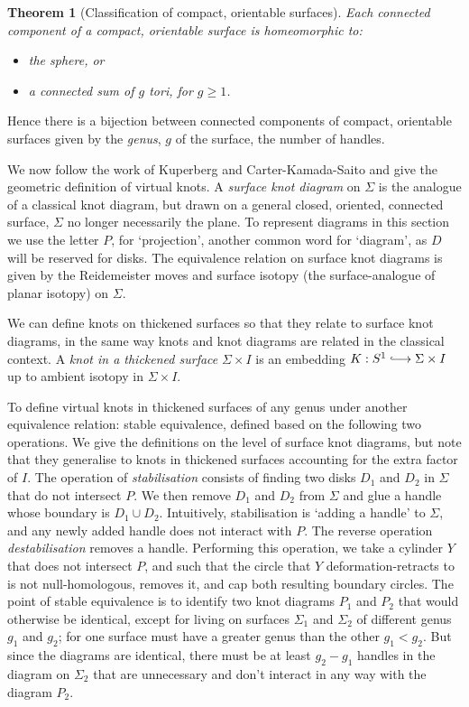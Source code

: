 \documentclass[12pt]{report}
\newtheorem*{theorem}{Theorem}
\begin{document}
\begin{theorem}[Classification of compact, orientable surfaces]
Each connected component of a compact, orientable surface is homeomorphic to:
\begin{itemize}
	\item the sphere, or
	\item a connected sum of $g$ tori, for $g \geq 1$.
\end{itemize}
\end{theorem}
Hence there is a bijection between connected components of compact, orientable surfaces given by the \textit{genus}, $g$ of the surface, the number of handles.

We now follow the work of Kuperberg \cite{what-is-a-virtual-link} and Carter-Kamada-Saito \cite{stable-equivalence-virtual-cobordisms} and give the geometric definition of virtual knots. A \textit{surface knot diagram} on $\Sigma$ is the analogue of a classical knot diagram, but drawn on a general closed, oriented, connected surface, $\Sigma$ no longer necessarily the plane. To represent diagrams in this section we use the letter $P$, for `projection', another common word for `diagram', as $D$ will be reserved for disks. The equivalence relation on surface knot diagrams is given by the Reidemeister moves and surface isotopy (the surface-analogue of planar isotopy) on $\Sigma$.

We can define knots on thickened surfaces so that they relate to surface knot diagrams, in the same way knots and knot diagrams are related in the classical context. A \textit{knot in a thickened surface} $\Sigma \times I$ is an embedding $K:S^{1} \lhook\joinrel\longrightarrow \Sigma \times I$ up to ambient isotopy in $\Sigma \times I$.

To define virtual knots in thickened surfaces of any genus under another equivalence relation: stable equivalence, defined based on the following two operations. We give the definitions on the level of surface knot diagrams, but note that they generalise to knots in thickened surfaces accounting for the extra factor of $I$. The operation of \textit{stabilisation} consists of finding two disks $D_{1}$ and $D_{2}$ in $\Sigma$ that do not intersect $P$. We then remove $D_{1}$ and $D_{2}$ from $\Sigma$ and glue a handle whose boundary is $D_{1} \cup D_{2}$. Intuitively, stabilisation is `adding a handle' to $\Sigma$, and any newly added handle does not interact with $P$. The reverse operation \textit{destabilisation} removes a handle. Performing this operation, we take a cylinder $Y$ that does not intersect $P$, and such that the circle that $Y$ deformation-retracts to is not null-homologous, removes it, and cap both resulting boundary circles. The point of stable equivalence is to identify two knot diagrams $P_{1}$ and $P_{2}$ that would otherwise be identical, except for living on surfaces $\Sigma_{1}$ and $\Sigma_{2}$ of different genus $g_{1}$ and $g_{2}$; for one surface must have a greater genus than the other $g_{1} < g_{2}$. But since the diagrams are identical, there must be at least $g_{2} - g_{1}$ handles in the diagram on $\Sigma_{2}$ that are unnecessary and don't interact in any way with the diagram $P_{2}$.
\end{document}
